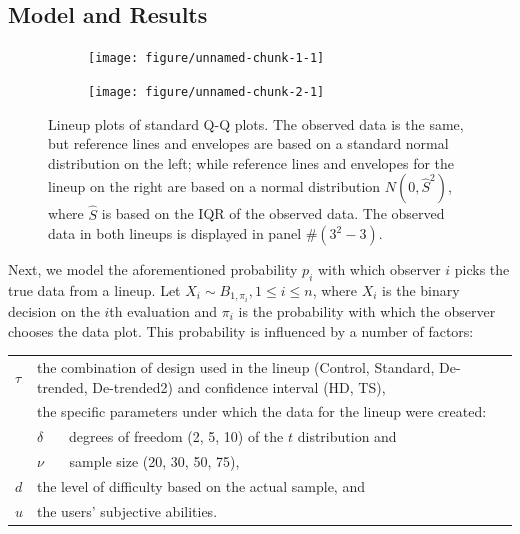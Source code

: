 \documentclass{article}\usepackage[]{graphicx}\usepackage[]{color}
\newenvironment{knitrout}{}{} %
\begin{document}
\newpage
\begin{appendix}
\section{Model and Results}


\begin{figure}[hbt]

\begin{subfigure}{0.5\textwidth}
\begin{knitrout}
\color{fgcolor}
\texttt{[image: figure/unnamed-chunk-1-1]} 

\end{knitrout}
\end{subfigure}
\begin{subfigure}{0.5\textwidth}
\begin{knitrout}
\color{fgcolor}
\texttt{[image: figure/unnamed-chunk-2-1]} 

\end{knitrout}
\end{subfigure}
\caption{\label{fig:lps} Lineup plots of standard Q-Q plots. The observed data is the same, but  reference lines and envelopes are based on a standard normal distribution on the left; while  reference lines and envelopes for the lineup on the right are based on a normal distribution $N(0, \widehat{S}^2)$, where $\widehat{S}$ is based on the IQR of the observed data.
The observed data in both lineups is displayed in panel \#$(3^2 - 3)$. }
\end{figure}

Next, we model the aforementioned probability $p_i$ with which observer $i$ picks the true data from a lineup. 
Let $X_i \sim B_{1, \pi_i}, 1 \le i \le n$, where $X_i$ is the binary decision on the $i$th evaluation and $\pi_i$ is the probability with which the observer chooses the data plot. This probability is influenced by a number of factors:

\begin{center}
\begin{tabular}{lp{5in}}
$\tau$ & the combination of design used in the lineup (Control, Standard, De-trended, De-trended2) and confidence interval (HD, TS), \\
&  the specific parameters under which the data for the lineup were created: \\
&  $\delta$ \ \ \ degrees of freedom (2, 5, 10) {of the $t$ distribution} and \\
&  $\nu$  \ \ \ sample size (20, 30, 50, 75), \\
$d$ &  the level of difficulty based on the actual sample, and \\
$u$ & the users' subjective abilities.
 \end{tabular}
\end{center}
%


\end{appendix}
\end{document}
